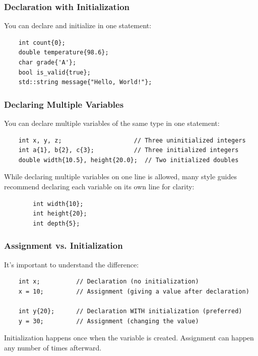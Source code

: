 \subsubsection{Declaration with Initialization}

You can declare and initialize in one statement:

\begin{lstlisting}
	int count{0};
	double temperature{98.6};
	char grade{'A'};
	bool is_valid{true};
	std::string message{"Hello, World!"};
\end{lstlisting}

\subsubsection{Declaring Multiple Variables}

You can declare multiple variables of the same type in one statement:

\begin{lstlisting}
	int x, y, z;                    // Three uninitialized integers
	int a{1}, b{2}, c{3};           // Three initialized integers
	double width{10.5}, height{20.0};  // Two initialized doubles
\end{lstlisting}

\begin{remark}
	While declaring multiple variables on one line is allowed, many style guides recommend declaring each variable on its own line for clarity:
	
	\begin{lstlisting}
		int width{10};
		int height{20};
		int depth{5};
	\end{lstlisting}
\end{remark}

\subsubsection{Assignment vs. Initialization}

It's important to understand the difference:

\begin{lstlisting}
	int x;          // Declaration (no initialization)
	x = 10;         // Assignment (giving a value after declaration)
	
	int y{20};      // Declaration WITH initialization (preferred)
	y = 30;         // Assignment (changing the value)
\end{lstlisting}

Initialization happens once when the variable is created. Assignment can happen any number of times afterward.

